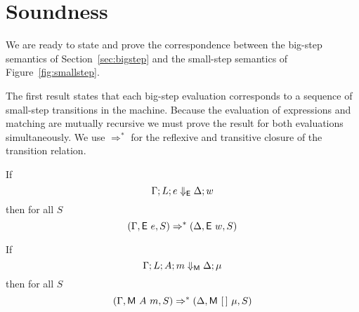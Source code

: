 
\section{Soundness} \label{sec:soundness}

We are ready to state and prove the correspondence between the big-step
semantics of Section~\ref{sec:bigstep} and the small-step semantics of
Figure~\ref{fig:smallstep}.

The first result states that each big-step evaluation corresponds to a
sequence of small-step transitions in the machine.  Because the
evaluation of expressions and matching are mutually recursive we must
prove the result for both evaluations simultaneously.  We use
$\Rightarrow^{*}$ for the reflexive and transitive closure of the
transition relation.

\begin{theorem}
  If
  \[ \Gamma; L; e \Downarrow_{\textsf{E}} \Delta; w \]
  then for all $S$
  \[ (\Gamma, \textsf{E}~e,  S) \Rightarrow^{*}
    (\Delta, \textsf{E}~w, S)
  \]

  If
  \[ \Gamma; L; A; m \Downarrow_{\textsf{M}} \Delta; \mu
  \]
  then for all $S$
  \[
    (\Gamma, \textsf{M}~A~m, S) \Rightarrow^{*}
    (\Delta, \textsf{M}~[\,]~\mu, S)
  \]
\end{theorem}

